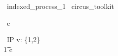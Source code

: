 \begin{zsection}
  \SECTION\ indexed\_process\_1 \parents\ circus\_toolkit
\end{zsection}

\begin{circus}
    \circchannel\ c
\end{circus}

\begin{circus}
    \circprocess\ IP \circdef  v: \{1,2\} \circindex \circbegin  \\
        \t1 \circspot c \then \Skip \\
    \circend
\end{circus}
